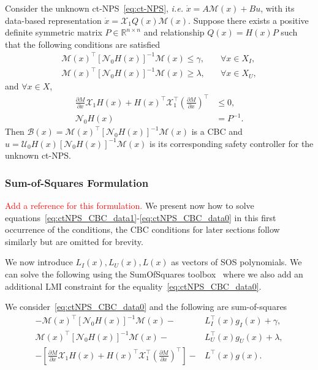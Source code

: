 \documentclass[sigconf]{acmart}
\newcommand{\BW}{\textcolor{red}}
\begin{document}
\begin{theorem}
\label{thm:data-ctNPS-CBC}
Consider the unknown ct-NPS~\eqref{eq:ct-NPS}, \emph{i.e.} $\dot{x} = A\mathcal{M}(x)+Bu$, with its data-based representation $\dot{x}=\mathcal{X}_{1}Q(x)\mathcal{M}(x)$.
Suppose there exists a positive definite symmetric matrix $P\in\mathbb{R}^{n\times n}$ and relationship $Q(x)=H(x)P$ such that the following conditions are satisfied
\begin{align}
\label{eq:ctNPS_CBC_data1}
\mathcal{M}(x)^\top [\mathcal{N}_{0}H(x)]^{-1}\mathcal{M}(x) \leq \gamma, &\quad\forall x\in X_I, \\
\label{eq:ctNPS_CBC_data2}
\mathcal{M}(x)^\top [\mathcal{N}_{0}H(x)]^{-1}\mathcal{M}(x) \geq \lambda, &\quad\forall x\in X_U,
\end{align}
and $\forall x\in X$,
\begin{align}
\label{eq:ctNPS_CBC_data3}
\frac{\partial M}{\partial x}\mathcal{X}_{1}H(x) + H(x)^\top\mathcal{X}_{1}^\top(\frac{\partial M}{\partial x})^\top &\leq 0,\\
\label{eq:ctNPS_CBC_data0}
\mathcal{N}_{0}H(x)&=P^{-1}.
\end{align}
Then $\mathcal{B}(x) = \mathcal{M}(x)^\top [\mathcal{N}_{0}H(x)]^{-1}\mathcal{M}(x)$ is a CBC and \newline $u = \mathcal{U}_{0}H(x)[\mathcal{N}_{0}H(x)]^{-1}\mathcal{M}(x)$ is its corresponding safety controller for the unknown ct-NPS.
\end{theorem}

\subsubsection{Sum-of-Squares Formulation}
\BW{Add a reference for this formulation.} We present now how to solve equations~\eqref{eq:ctNPS_CBC_data1}-\eqref{eq:ctNPS_CBC_data0} in this first occurrence of the conditions, the CBC conditions for later sections follow similarly but are omitted for brevity.

We now introduce $L_I(x),L_U(x),L(x)$ as vectors of SOS polynomials.
We can solve the following using the SumOfSquares toolbox~\cite{Yuan_SumOfSquares_py} where we also add an additional LMI constraint for the equality~\eqref{eq:ctNPS_CBC_data0}.

We consider~\eqref{eq:ctNPS_CBC_data0}
and the following are sum-of-squares
\begin{align}
\label{eq:ct-SOS1}
-\mathcal{M}(x)^\top [\mathcal{N}_{0}H(x)]^{-1}\mathcal{M}(x) -& L_I^\top(x)g_I(x) + \gamma, \\
\label{eq:ct-SOS2}
\mathcal{M}(x)^\top [\mathcal{N}_{0}H(x)]^{-1}\mathcal{M}(x) -& L_U^\top(x)g_U(x) + \lambda, \\
\label{eq:ct-SOS3}
-[\frac{\partial M}{\partial x}\mathcal{X}_{1}H(x) + H(x)^\top\mathcal{X}_{1}^\top(\frac{\partial M}{\partial x})^\top] -& L^\top(x)g(x).
\end{align}
\end{document}
